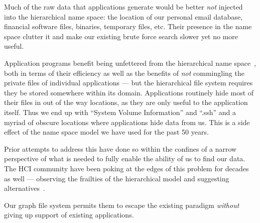 Much of the raw data that applications generate would be better \textit{not} injected into
the hierarchical name space: the location of our personal email database, financial
software files, binaries, temporary files, etc.  Their presence in the name space clutter
it and make our existing brute force search slower yet no more useful.

Application programs benefit being
unfettered from the hierarchical name space~\cite{Ghemawat2003}, both
in terms of their efficiency as well as the benefits of \textit{not} commingling the private files of individual 
applications --- but the hierarchical file system requires
they be stored somewhere within its domain.
Applications routinely hide most of their files in out of the way 
locations, as they are only useful to the application itself.
Thus we end up with ``System Volume Information'' and ``.ssh'' and a myriad of obscure locations where applications 
hide data from us.
This is a side effect of the name space model we have used for the past
50 years.

Prior attempts to address this have done so within the confines of a narrow perspective of what is needed to fully 
enable the ability of us to find our data.  The HCI community have been poking at the
edges of this problem for decades as well --- observing the frailties of the hierarchical model and suggesting
alternatives~\cite{harper2013file,lindley2018exploring,khan2018forgotten,vitale2018hoarding,boardman2003too,nayuki2017,martin2014,Jan2011,Andrews2012,Mander1992,Omvlee2009}.

Our graph file system permits them to escape the existing paradigm \textit{without} giving up support
of existing applications.
